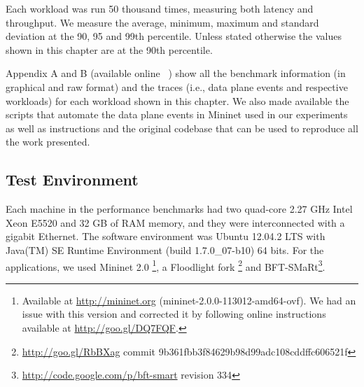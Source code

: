 
Each workload was run 50 thousand times, measuring both latency and throughput. 
We measure the average, minimum, maximum and standard deviation at the 90, 95 and 99th percentile. 
Unless stated otherwise the values shown in this chapter are at the 90th percentile. 

Appendix A and B (available online ~\cite{support}) show all the benchmark information (in graphical and raw format) and the traces (i.e., data plane events and respective workloads) for each workload shown in this chapter.  
We also made available the scripts that automate the data plane events in Mininet used in our experiments as well as instructions and the original codebase that can be used to reproduce all the work presented. 

\subsection{Test Environment}
Each machine in the performance benchmarks had two quad-core 2.27 GHz Intel Xeon E5520 and 32 GB of RAM memory, and they were interconnected with a gigabit Ethernet. 
The software environment was  Ubuntu 12.04.2 LTS with  Java(TM) SE Runtime Environment (build 1.7.0\_07-b10) 64 bits.
For the applications, we  used Mininet 2.0 \footnote{Available at \url{http://mininet.org} (mininet-2.0.0-113012-amd64-ovf). We had an issue with this version and corrected it by following online instructions available at \url{http://goo.gl/DQ7FQF}.},  a Floodlight fork \footnote{\url{http://goo.gl/RbBXag} commit 9b361fbb3f84629b98d99adc108cddffc606521f} and  BFT-SMaRt\footnote{\url{http://code.google.com/p/bft-smart} revision 334}.  



